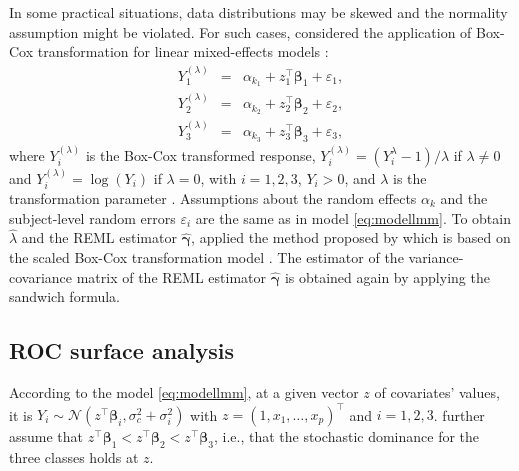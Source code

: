 In some practical situations, data distributions may be skewed and the {normality assumption} might be violated. For such cases, \citet{khanh2022} considered the application of Box-Cox transformation for linear {mixed-effects} models
\citep{lipsitz2000using, gurka2006extending}: 
\begin{eqnarray}
    Y^{(\lambda)}_{1} &=& \alpha_{k_1} + z_1^\top \boldsymbol{\beta}_1 + \varepsilon_{1}, \nonumber \\
    Y^{(\lambda)}_{2} &=& \alpha_{k_2} + z_2^\top \boldsymbol{\beta}_2 + \varepsilon_{2}, \label{eq:modellmmbxc} \\
    Y^{(\lambda)}_{3} &=& \alpha_{k_3} + z_3^\top \boldsymbol{\beta}_3 + \varepsilon_{3}, \nonumber
\end{eqnarray} 
where $Y^{(\lambda)}_{i}$ is the Box-Cox transformed response, $Y^{(\lambda)}_{i} = (Y^{\lambda}_{i} - 1)/\lambda$ if $\lambda \ne 0$ and $Y^{(\lambda)}_{i} = \log(Y_{i})$ if $\lambda = 0$, with $i = 1,2,3$, $Y_{i} > 0$, and $\lambda$ is the transformation parameter \citep{box1964analysis}. Assumptions about the random effects $\alpha_{k}$ and the subject-level random errors $\varepsilon_{i}$ are the same as in model \eqref{eq:modellmm}. To obtain $\widehat{\lambda}$ and the REML estimator $\widehat{\boldsymbol{\gamma}}$, \citet{khanh2022} applied the method proposed by \citet{gurka2011estimating} which is based on the scaled Box-Cox transformation model \citep{gurka2006extending}. The estimator of the variance-covariance matrix of the REML estimator $\widehat{\boldsymbol{\gamma}}$ is obtained again by applying the sandwich formula.

\hypertarget{roc-surface-analysis}{%
\subsection{ROC surface analysis}\label{roc-surface-analysis}}

According to the model \eqref{eq:modellmm}, at a given vector $z$ of covariates' values, it is $Y_i \sim \mathcal{N}(z^\top \boldsymbol{\beta}_i, \sigma^2_c + \sigma^2_i)$ with $z = (1, x_{1}, \ldots, x_{p})^\top$ and $i = 1, 2, 3$. \citet{khanh2022} further assume that $z^\top \boldsymbol{\beta}_1 < z^\top \boldsymbol{\beta}_2 < z^\top \boldsymbol{\beta}_3$, i.e., that the stochastic dominance for the three classes holds at $z$.

